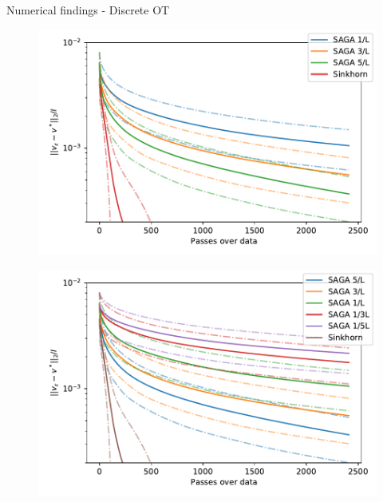\documentclass{beamer}
\begin{document}
\begin{frame}{Numerical findings - Discrete OT}
\begin{minipage}{.4\linewidth}
\begin{figure}
            \includegraphics[width=\linewidth]{figures/sag_image_retreival_vs_avg.pdf}
        \end{figure}
        \begin{figure}
            \includegraphics[width=\linewidth]{figures/saga_image_retreival_vs_avg.pdf}
        \end{figure}
    \end{minipage}
\end{frame}
\end{document}
